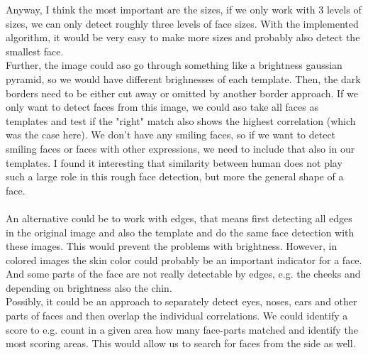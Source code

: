 \documentclass[a4paper,8pt]{extarticle}\usepackage[]{graphicx}\usepackage[]{color}
\begin{document}
Anyway, I think the most important are the sizes, if we only work with 3 levels of sizes, we can only detect roughly three levels of face sizes. With the implemented algorithm, it would be very easy to make more sizes and probably also detect the smallest face. \\
Further, the image could aso go through something like a brightness gaussian pyramid, so we would have different brighnesses of each template. Then, the dark borders need to be either cut away or omitted by another border approach. If we only want to detect faces from this image, we could aso take all faces as templates and test if the "right" match also shows the highest correlation (which was the case here). We don't have any smiling faces, so if we want to detect smiling faces or faces with other expressions, we need to include that also in our templates. 
I found it interesting that similarity between human does not play such a large role in this rough face detection, but more the general shape of a face. \\ \\

An alternative could be to work with edges, that means first detecting all edges in the original image and also the template and do the same face detection with these images. This would prevent the problems with brightness. However, in colored images the skin color could probably be an important indicator for a face. And some parts of the face are not really detectable by edges, e.g. the cheeks and depending on brightness also the chin. \\
Possibly, it could be an approach to separately detect eyes, noses, ears and other parts of faces and then overlap the individual correlations. We could identify a score to e.g. count in a given area how many face-parts matched and identify the most scoring areas. This would allow us to search for faces from the side as well. 



\end{document}
